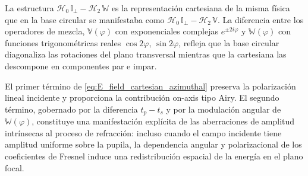 La estructura $\mathscr{H}_0\,\mathbb{I}_\perp - \mathscr{H}_2\,\mathbb{W}$ es la representación cartesiana de la misma física que en la base circular se manifestaba como $\mathscr{H}_0\,\mathbb{I}_\perp - \mathscr{H}_2\,\mathbb{V}$. La diferencia entre los operadores de mezcla, $\mathbb{V}(\varphi)$ con exponenciales complejas $e^{\pm 2i\varphi}$ y $\mathbb{W}(\varphi)$ con funciones trigonométricas reales $\cos 2\varphi$, $\sin 2\varphi$, refleja que la base circular diagonaliza las rotaciones del plano transversal mientras que la cartesiana las descompone en componentes par e impar.

El primer término de \eqref{eq:E_field_cartesian_azimuthal} preserva la polarización lineal incidente y proporciona la contribución on-axis tipo Airy. El segundo término, gobernado por la diferencia $t_p-t_s$ y por la modulación angular de $\mathbb{W}(\varphi)$, constituye una manifestación explícita de las aberraciones de amplitud intrínsecas al proceso de refracción: incluso cuando el campo incidente tiene amplitud uniforme sobre la pupila, la dependencia angular y polarizacional de los coeficientes de Fresnel induce una redistribución espacial de la energía en el plano focal.

